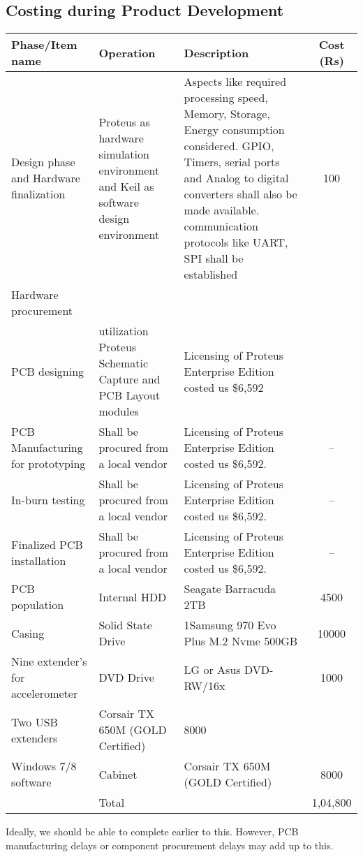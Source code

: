 \documentclass{FR16}
\begin{document}
\newpage
\subsection{Costing during Product Development}
\begin{center}
\begin{tabular}{||p{3 cm} ||p{4 cm}|| p{6 cm}|| c|| }
\arrayrulecolor{Azzurro}
\hline
\hline

{\bfseries Phase/Item name } & {\bfseries Operation}& {\bfseries Description} & {\bfseries Cost (Rs)} \\
\hline
\hline
Design phase and Hardware finalization& Proteus as hardware simulation environment and Keil as
software design environment &  Aspects like required  processing speed, Memory, Storage, Energy consumption considered. GPIO, Timers, serial ports and Analog to digital converters shall also be made available. communication protocols like UART, SPI shall be established &100\\
\hline
\hline
Hardware procurement & & &  \\
\hline
\hline
PCB designing & utilization Proteus Schematic Capture and PCB Layout modules  & Licensing of Proteus Enterprise Edition costed us \$6,592&\\ 
\hline 
\hline
PCB Manufacturing for prototyping & Shall be procured from a local vendor & Licensing of Proteus Enterprise Edition costed us \$6,592.& --\\
\hline 
\hline
In-burn testing & Shall be procured from a local vendor & Licensing of Proteus Enterprise Edition costed us \$6,592.& --\\
\hline 
\hline
Finalized PCB installation & Shall be procured from a local vendor & Licensing of Proteus Enterprise Edition costed us \$6,592.& --\\
\hline 
\hline
PCB population &Internal HDD & Seagate Barracuda 2TB & 4500\\ 
\hline
\hline
Casing &Solid State Drive & 1Samsung 970 Evo Plus M.2 Nvme 500GB  & 10000\\
\hline
\hline
Nine extender's for accelerometer &DVD Drive & LG or Asus DVD-RW/16x & 1000\\
\hline
\hline
Two USB extenders &  Corsair TX 650M (GOLD Certified) & 8000 &\\
\hline
\hline
Windows 7/8 software &Cabinet &  Corsair TX 650M (GOLD Certified) & 8000\\
\hline
\hline
& Total & & 1,04,800
 
 \end{tabular}
\end{center}
Ideally, we should be able to complete earlier to this. However, PCB manufacturing delays or component procurement delays may add up to this.
\end{document}
